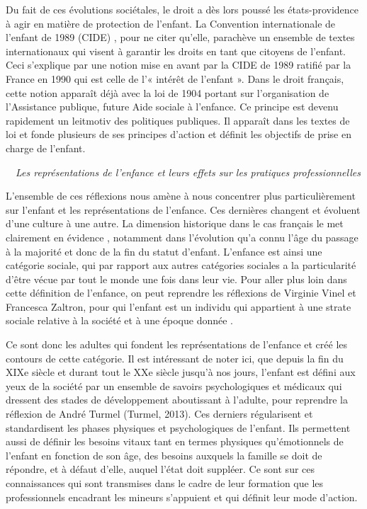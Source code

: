 \documentclass[
  12,
  a4paper,
]{report}
\begin{document}
Du fait de ces évolutions sociétales, le droit a dès lors poussé les
états-providence à agir en matière de protection de l'enfant. La
Convention internationale de l'enfant de 1989 (CIDE) , pour ne citer
qu'elle, parachève un ensemble de textes internationaux qui visent à
garantir les droits en tant que citoyens de l'enfant. Ceci s'explique
par une notion mise en avant par la CIDE de 1989 ratifié par la France
en 1990 qui est celle de l'« intérêt de l'enfant ». Dans le droit
français, cette notion apparaît déjà avec la loi de 1904 portant sur
l'organisation de l'Assistance publique, future Aide sociale à
l'enfance. Ce principe est devenu rapidement un leitmotiv des politiques
publiques. Il apparaît dans les textes de loi et fonde plusieurs de ses
principes d'action et définit les objectifs de prise en charge de
l'enfant.

~~\emph{Les représentations de l'enfance et leurs effets sur les
pratiques professionnelles}

L'ensemble de ces réflexions nous amène à nous concentrer plus
particulièrement sur l'enfant et les représentations de l'enfance. Ces
dernières changent et évoluent d'une culture à une autre. La dimension
historique dans le cas français le met clairement en évidence ,
notamment dans l'évolution qu'a connu l'âge du passage à la majorité et
donc de la fin du statut d'enfant. L'enfance est ainsi une catégorie
sociale, qui par rapport aux autres catégories sociales a la
particularité d'être vécue par tout le monde une fois dans leur vie.
Pour aller plus loin dans cette définition de l'enfance, on peut
reprendre les réflexions de Virginie Vinel et Francesca Zaltron, pour
qui l'enfant est un individu qui appartient à une strate sociale
relative à la société et à une époque donnée .

Ce sont donc les adultes qui fondent les représentations de l'enfance et
créé les contours de cette catégorie. Il est intéressant de noter ici,
que depuis la fin du XIXe siècle et durant tout le XXe siècle jusqu'à
nos jours, l'enfant est défini aux yeux de la société par un ensemble de
savoirs psychologiques et médicaux qui dressent des stades de
développement aboutissant à l'adulte, pour reprendre la réflexion de
André Turmel (Turmel, 2013). Ces derniers régularisent et standardisent
les phases physiques et psychologiques de l'enfant. Ils permettent aussi
de définir les besoins vitaux tant en termes physiques qu'émotionnels de
l'enfant en fonction de son âge, des besoins auxquels la famille se doit
de répondre, et à défaut d'elle, auquel l'état doit suppléer. Ce sont
sur ces connaissances qui sont transmises dans le cadre de leur
formation que les professionnels encadrant les mineurs s'appuient et qui
définit leur mode d'action.
\end{document}

